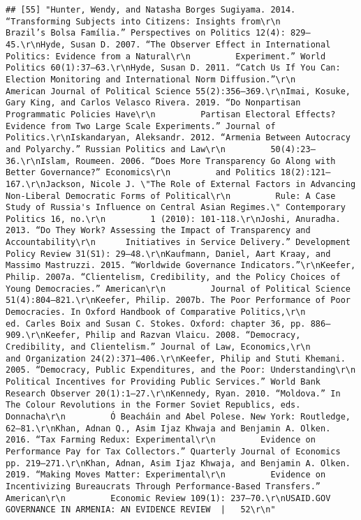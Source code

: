\documentclass[
]{article}
\begin{document}
\begin{verbatim}
## [55] "Hunter, Wendy, and Natasha Borges Sugiyama. 2014. “Transforming Subjects into Citizens: Insights from\r\n         Brazil’s Bolsa Família.” Perspectives on Politics 12(4): 829–45.\r\nHyde, Susan D. 2007. “The Observer Effect in International Politics: Evidence from a Natural\r\n         Experiment.” World Politics 60(1):37–63.\r\nHyde, Susan D. 2011. “Catch Us If You Can: Election Monitoring and International Norm Diffusion.”\r\n         American Journal of Political Science 55(2):356–369.\r\nImai, Kosuke, Gary King, and Carlos Velasco Rivera. 2019. “Do Nonpartisan Programmatic Policies Have\r\n         Partisan Electoral Effects? Evidence from Two Large Scale Experiments.” Journal of Politics.\r\nIskandaryan, Aleksandr. 2012. “Armenia Between Autocracy and Polyarchy.” Russian Politics and Law\r\n         50(4):23–36.\r\nIslam, Roumeen. 2006. “Does More Transparency Go Along with Better Governance?” Economics\r\n         and Politics 18(2):121–167.\r\nJackson, Nicole J. \"The Role of External Factors in Advancing Non-Liberal Democratic Forms of Political\r\n         Rule: A Case Study of Russia's Influence on Central Asian Regimes.\" Contemporary Politics 16, no.\r\n         1 (2010): 101-118.\r\nJoshi, Anuradha. 2013. “Do They Work? Assessing the Impact of Transparency and Accountability\r\n      Initiatives in Service Delivery.” Development Policy Review 31(S1): 29–48.\r\nKaufmann, Daniel, Aart Kraay, and Massimo Mastruzzi. 2015. “Worldwide Governance Indicators.”\r\nKeefer, Philip. 2007a. “Clientelism, Credibility, and the Policy Choices of Young Democracies.” American\r\n         Journal of Political Science 51(4):804–821.\r\nKeefer, Philip. 2007b. The Poor Performance of Poor Democracies. In Oxford Handbook of Comparative Politics,\r\n         ed. Carles Boix and Susan C. Stokes. Oxford: chapter 36, pp. 886– 909.\r\nKeefer, Philip and Razvan Vlaicu. 2008. “Democracy, Credibility, and Clientelism.” Journal of Law, Economics,\r\n         and Organization 24(2):371–406.\r\nKeefer, Philip and Stuti Khemani. 2005. “Democracy, Public Expenditures, and the Poor: Understanding\r\n         Political Incentives for Providing Public Services.” World Bank Research Observer 20(1):1–27.\r\nKennedy, Ryan. 2010. “Moldova.” In The Colour Revolutions in the Former Soviet Republics, eds. Donnacha\r\n         Ó Beacháin and Abel Polese. New York: Routledge, 62–81.\r\nKhan, Adnan Q., Asim Ijaz Khwaja and Benjamin A. Olken. 2016. “Tax Farming Redux: Experimental\r\n         Evidence on Performance Pay for Tax Collectors.” Quarterly Journal of Economics pp. 219–271.\r\nKhan, Adnan, Asim Ijaz Khwaja, and Benjamin A. Olken. 2019. “Making Moves Matter: Experimental\r\n         Evidence on Incentivizing Bureaucrats Through Performance-Based Transfers.” American\r\n         Economic Review 109(1): 237–70.\r\nUSAID.GOV                                                     GOVERNANCE IN ARMENIA: AN EVIDENCE REVIEW  |   52\r\n"                                                                                                                                                                                                                                                                                                                                                                      
\end{verbatim}
\end{document}
